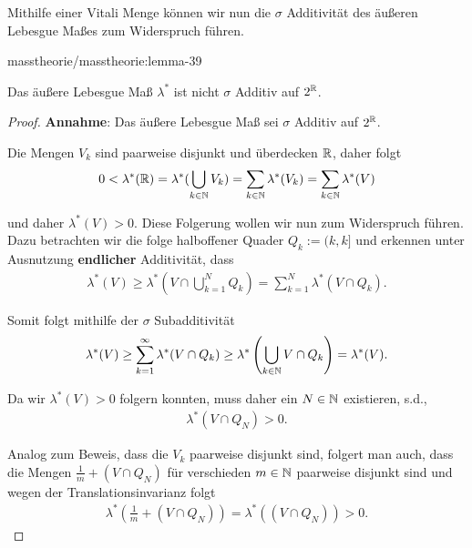 \par
Mithilfe einer Vitali Menge können wir nun die \(\sigma\) Additivität des äußeren Lebesgue Maßes zum Widerspruch führen.
\begin{lemma}{}{masstheorie/masstheorie:lemma-39}



\par
Das äußere Lebesgue Maß \(\lambda^\ast\) ist nicht \(\sigma\) Additiv auf \(2^{\mathbb{R}}\).
\end{lemma}

\begin{proof}
 \textbf{Annahme}: Das äußere Lebesgue Maß sei \(\sigma\) Additiv auf \(2^{\mathbb{R}}\).

\par
Die Mengen \(V_k\) sind paarweise disjunkt und überdecken \(\mathbb{R}\), daher folgt
\begin{align*}
0<\lambda^\ast(\mathbb{R}) = \lambda^\ast(\bigcup_{k\in\mathbb{N}} V_k) = \sum_{k\in\mathbb{N}} \lambda^\ast(V_k) = \sum_{k\in\mathbb{N}} \lambda^\ast(V)
\end{align*}
\par
und daher \(\lambda^\ast(V)>0\). Diese Folgerung wollen wir nun zum Widerspruch führen. Dazu betrachten wir die folge halboffener Quader \(Q_k:=(k,k]\) und erkennen unter Ausnutzung \textbf{endlicher} Additivität, dass
\begin{align*}
\lambda^\ast(V) \geq \lambda^\ast\left(V \cap \bigcup_{k=1}^N Q_k\right) = 
\sum_{k=1}^N \lambda^\ast(V\cap Q_k).
\end{align*}
\par
Somit folgt mithilfe der \(\sigma\) Subadditivität
\begin{align*}
\lambda^\ast(V) \geq \sum_{k=1}^\infty \lambda^\ast(V\cap Q_k) \geq
\lambda^\ast\left(\bigcup_{k\in\mathbb{N}} V\cap Q_k\right) = \lambda^\ast(V).
\end{align*}
\par
Da wir \(\lambda^\ast(V)>0\) folgern konnten, muss daher ein \(N\in\mathbb{N}\) existieren, s.d.,
\begin{align*}
\lambda^\ast(V\cap Q_N) >0.
\end{align*}
\par
Analog zum Beweis, dass die \(V_k\) paarweise disjunkt sind, folgert man auch, dass die Mengen \(\frac{1}{m}+(V\cap Q_N)\) für verschieden \(m\in\mathbb{N}\) paarweise disjunkt sind und wegen der Translationsinvarianz folgt
\begin{align*}
\lambda^\ast(\frac{1}{m}+(V\cap Q_N)) = \lambda^\ast((V\cap Q_N)) >0.
\end{align*}

\end{proof}
